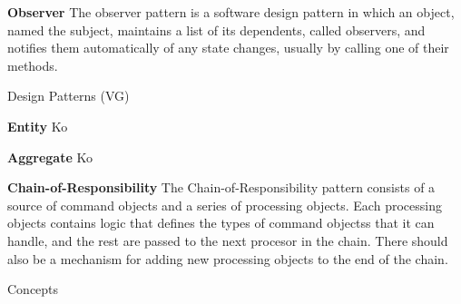 \documentclass{article}
\begin{document}
\begin{Parallel}[v]{0.48\textwidth}{0.48\textwidth}
{        \textbf{Observer}\newline
        The observer pattern is a software design pattern in which an object, named the subject, maintains a list of its dependents, called observers, and notifies them automatically of any state changes, usually by calling one of their methods.
    }
    \ParallelPar
\end{Parallel}
\newpage


\begin{center}
    {\huge Design Patterns (VG)}
\end{center}

\textbf{Entity}\newline
Ko

\textbf{Aggregate}\newline
Ko

\textbf{Chain-of-Responsibility}\newline
The Chain-of-Responsibility pattern consists of a source of command objects
and a series of processing objects. Each processing objects contains logic that
defines the types of command objectss that it can handle, and the rest are passed to the
next procesor in the chain. There should also be a mechanism for adding new processing
objects to the end of the chain.



\begin{center}
    {\huge Concepts}
\end{center}
\end{document}
